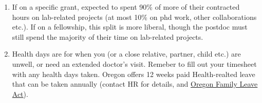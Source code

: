 \documentclass[12pt]{article}
\begin{document}
\begin{enumerate}
\item If on a specific grant, expected to spent 90\% of more of
  their contracted hours on lab-related projects (at most 10\%
  on phd work, other collaborations etc.). If on a fellowship,
  this split is more liberal, though the postdoc must still
  spend the majority of their time on lab-related projects.
\item Health days are for when you (or a close relative, partner,
  child etc.) are unwell, or need an extended doctor's visit. Remeber
  to fill out your timesheet with any health days taken. Oregon offers
  12 weeks paid Health-realted leave that can be taken annually
  (contact HR for details, and
  \href{https://www.oregon.gov/boli/workers/pages/oregon-family-leave.aspx}{Oregon
  Family Leave Act}).
\end{enumerate}
\end{document}
